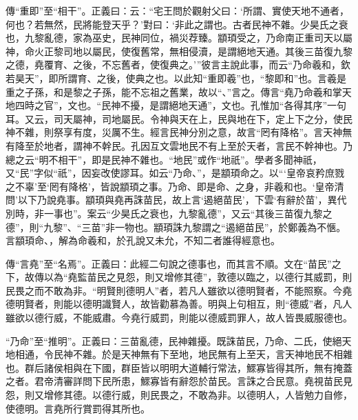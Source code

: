 {\noindent\zhuan{}\fzbyks 傳“重即”至“相干”。正義曰：云：“宅王問於觀射父曰：‘所謂、實使天地不通者，何也？若無然，民將能登天乎？’對曰：‘非此之謂也。古者民神不雜。少昊氏之衰也，九黎亂德，家為巫史，民神同位，禍災荐臻。顓頊受之，乃命南正重司天以屬神，命火正黎司地以屬民，使復舊常，無相侵瀆，是謂絕地天通。其後三苗復九黎之德，堯覆育、之後，不忘舊者，使復典之。’”彼言主說此事，而云“乃命羲和，欽若昊天”，即所謂育、之後，使典之也。以此知“重即羲”也，“黎即和”也。言羲是重之子孫，和是黎之子孫，能不忘祖之舊業，故以“、”言之。傳言“堯乃命羲和掌天地四時之官”，文也。“民神不擾，是謂絕地天通”，文也。孔惟加“各得其序”一句耳。又云，司天屬神，司地屬民。令神與天在上，民與地在下，定上下之分，使民神不雜，則祭享有度，災厲不生。經言民神分別之意，故言“罔有降格”。言天神無有降至於地者，謂神不幹民。孔因互文雲地民不有上至於天者，言民不幹神也。乃總之云“明不相干”，即是民神不雜也。“地民”或作“地祇”。學者多聞神祇，又“民”字似“祇”，因妄改使謬耳。如云“乃命、”，是顓頊命之。以“‘皇帝哀矜庶戮之不辜’至‘罔有降格’，皆說顓頊之事。乃命、即是命、之身，非羲和也。‘皇帝清問’以下乃說堯事。顓頊與堯再誅苗民，故上言‘遏絕苗民’，下雲‘有辭於苗’，異代別時，非一事也”。案云“少昊氏之衰也，九黎亂德”，又云“其後三苗復九黎之德”，則“九黎”、“三苗”非一物也。顓頊誅九黎謂之“遏絕苗民”，於鄭義為不愜。言顓頊命、，解為命羲和，於孔說又未允，不知二者誰得經意也。 \par}

{\noindent\zhuan{}\fzbyks 傳“言堯”至“名焉”。正義曰：此經二句說之德事也，而其言不順。文在“苗民”之下，故傳以為“堯監苗民之見怨，則又增修其德”，敦德以臨之，以德行其威罰，則民畏之而不敢為非。“明賢則德明人”者，若凡人雖欲以德明賢者，不能照察。今堯德明賢者，則能以德明識賢人，故皆勸慕為善。明與上句相互，則“德威”者，凡人雖欲以德行威，不能威肅。今堯行威罰，則能以德威罰罪人，故人皆畏威服德也。 \par}

{\noindent\shu{}\fzkt “乃命”至“推明”。正義曰：三苗亂德，民神雜擾。既誅苗民，乃命、二氏，使絕天地相通，令民神不雜。於是天神無有下至地，地民無有上至天，言天神地民不相雜也。群后諸侯相與在下國，群臣皆以明明大道輔行常法，鰥寡皆得其所，無有掩蓋之者。君帝清審詳問下民所患，鰥寡皆有辭怨於苗民。言誅之合民意。堯視苗民見怨，則又增修其德。以德行威，則民畏之，不敢為非。以德明人，人皆勉力自修，使德明。言堯所行賞罰得其所也。 \par}

